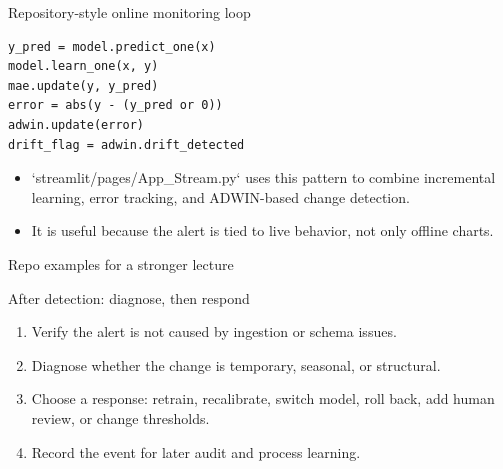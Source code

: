 \begin{frame}[fragile]{Repository-style online monitoring loop}
\begin{lstlisting}[style=coursepython]
y_pred = model.predict_one(x)
model.learn_one(x, y)
mae.update(y, y_pred)
error = abs(y - (y_pred or 0))
adwin.update(error)
drift_flag = adwin.drift_detected
\end{lstlisting}
\begin{itemize}
\item `streamlit/pages/App_Stream.py` uses this pattern to combine incremental learning, error tracking, and ADWIN-based change detection.
\item It is useful because the alert is tied to live behavior, not only offline charts.
\end{itemize}
\coursefooter
\end{frame}

\begin{frame}{Repo examples for a stronger lecture}
\coursefooter
\end{frame}

\begin{frame}{After detection: diagnose, then respond}
\begin{enumerate}
\item Verify the alert is not caused by ingestion or schema issues.
\item Diagnose whether the change is temporary, seasonal, or structural.
\item Choose a response: retrain, recalibrate, switch model, roll back, add human review, or change thresholds.
\item Record the event for later audit and process learning.
\end{enumerate}
\coursefooter
\end{frame}

